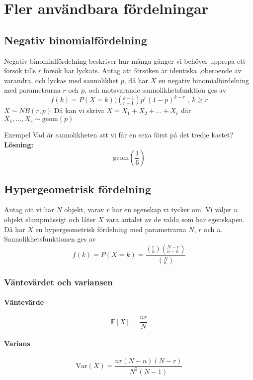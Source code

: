 \chapter{Fler användbara fördelningar}
\section{Negativ binomialfördelning}
Negativ binomialfördelning beskriver hur många gånger vi behöver upprepa ett försök tills $r$ försök har lyckats.
Antag att försöken är identiska ,oberoende av varandra, och lyckas med sannolikhet $p$, då har $X$ en negativ binomialfördelning med parametrarna $r$ och $p$, och motsvarande sannolikhetsfunktion ges av $$
	f(k)=P(X=k))\left(^{k-1}_{r-1}\right)p^r(1-p)^{k-r}\text{ , }k\geq r
$$
$X\sim NB(r,p)$ Då kan vi skriva $X=X_1+X_2+\ldots+X_r$ där $X_1,\ldots,X_r\sim\text{geom}(p)$
\begin{exempel}{Exempel}
	Vad är sannolikheten att vi får en sexa först på det tredje kastet?\\
	\textbf{Lösning:}\\
	$$\text{geom}(\frac{1}{6})$$
\end{exempel}

\section{Hypergeometrisk fördelning}
Antag att vi har $N$ objekt, varav $r$ har en egenskap vi tycker om. Vi väljer $n$ objekt slumpmässigt och låter $X$ vara antalet av de valda som har egenskapen. Då har $X$ en hypergeometrisk fördelning med parametrarna $N$, $r$ och $n$. Sannolikhetsfunktionen ges av $$
	f(k)=P(X=k)=\frac{\left(^{r}_{k}\right)\left(^{N-r}_{n-k}\right)}{\left(^{N}_{n}\right)}
$$
\subsection{Väntevärdet och variansen}
\subsubsection{Väntevärde}
$$\mathbb{E}[X]=\frac{nr}{N}$$

\subsubsection{Varians}
$$
	\text{Var}(X)=\frac{nr(N-n)(N-r)}{N^2(N-1)}
$$

